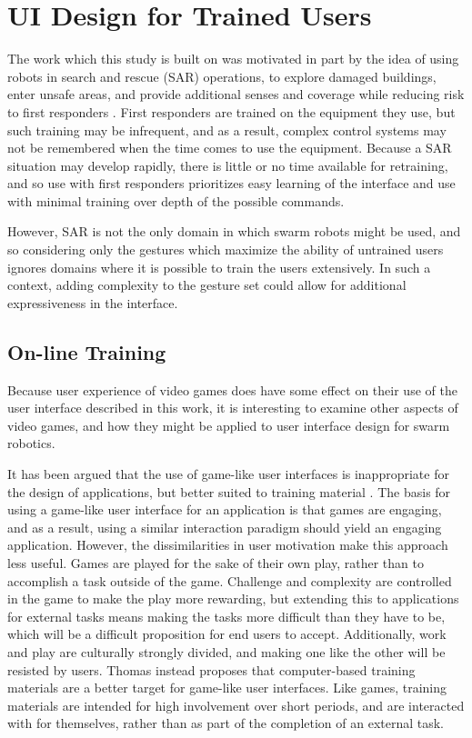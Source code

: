 \chapter{UI Design for Trained Users}
\thispagestyle{fancy}

The work which this study is built on was motivated in part by the idea of using robots in search and rescue (SAR) operations, to explore damaged buildings, enter unsafe areas, and provide additional senses and coverage while reducing risk to first responders \citep{micire2010multi}.
First responders are trained on the equipment they use, but such training may be infrequent, and as a result, complex control systems may not be remembered when the time comes to use the equipment. 
Because a SAR situation may develop rapidly, there is little or no time available for retraining, and so use with first responders prioritizes easy learning of the interface and use with minimal training over depth of the possible commands.  

However, SAR is not the only domain in which swarm robots might be used, and so considering only the gestures which maximize the ability of untrained users ignores domains where it is possible to train the users extensively. 
In such a context, adding complexity to the gesture set could allow for additional expressiveness in the interface.

\section{On-line Training}

Because user experience of video games does have some effect on their use of the user interface described in this work, it is interesting to examine other aspects of video games, and how they might be applied to user interface design for swarm robotics. 

It has been argued that the use of game-like user interfaces is inappropriate for the design of applications, but better suited to training material \citep{thomas1994games}. The basis for using a game-like user interface for an application is that games are engaging, and as a result, using a similar interaction paradigm should yield an engaging application. 
However, the dissimilarities in user motivation make this approach less useful. 
Games are played for the sake of their own play, rather than to accomplish a task outside of the game. 
Challenge and complexity are controlled in the game to make the play more rewarding, but extending this to applications for external tasks means making the tasks more difficult than they have to be, which will be a difficult proposition for end users to accept. 
Additionally, work and play are culturally strongly divided, and making one like the other will be resisted by users. 
Thomas instead proposes that computer-based training materials are a better target for game-like user interfaces. 
Like games, training materials are intended for high involvement over short periods, and are interacted with for themselves, rather than as part of the completion of an external task. 

